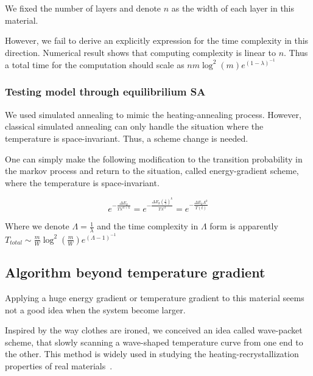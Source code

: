 \documentclass[twocolumn,superscriptaddress,english,showpacs,longbibliography]{revtex4-2}
\begin{document}
We fixed the number of layers and denote $n$ as the width of each layer in this material.

However, we fail to derive an explicitly expression for the time complexity in this direction. 
Numerical result shows that computing complexity is linear to $n$. Thus a total time
for the computation should scale as $nm\log^2(m)e^{(1-\lambda)^{-1}}$ 

\subsubsection{Testing model through equilibrilium SA}\label{temperature-gradient-and-energy-gradient}

We used simulated annealing to mimic the heating-annealing process.
However, classical simulated annealing can only handle the situation
where the temperature is space-invariant. Thus, a scheme change is needed.

One can simply
make the following modification to the transition probability in the
markov process and return to the situation, called energy-gradient scheme, where the temperature is space-invariant.

\begin{equation}
e^{-\frac{\Delta E_k}{T\lambda^{ct+k}}} = e^{-\frac{\Delta E_k(\frac{1}{\lambda})^k}{T\lambda^{ct}}} = e^{-\frac{\Delta E_k \Lambda^k}{T(t)}}
\end{equation}

Where we denote $\Lambda = \frac{1}{\lambda}$ and the time complexity in $\Lambda$ form is apparently
$T_{total} \sim \frac{m}{W}\log^2(\frac{m}{W})e^{(\Lambda-1)^{-1}}$



\subsection{Algorithm beyond temperature
gradient}\label{algorithm-beyond-temperature-gradient}

Applying a huge energy gradient or temperature gradient to this material
seems not a good idea when the system become larger.

Inspired by the way clothes are ironed, we conceived an idea called wave-packet scheme, that slowly
scanning a wave-shaped temperature curve from one end to the other. This
method is widely used in studying the heating-recrystallization
properties of real materials~\cite{Zhang2014}.
\end{document}
